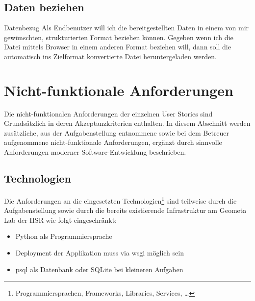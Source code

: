 \subsection{Daten beziehen}

\begin{scrumepic}[label=epic:pd:datenbezug]{Datenbezug}
	Als Endbenutzer will ich die bereitgestellten Daten in einem von mir gewünschten, strukturierten Format beziehen können.
	\storyacceptance	
	Gegeben
	wenn ich die Datei mittels Browser in einem anderen Format beziehen will, dann soll die automatisch ins Zielformat konvertierte Datei heruntergeladen werden.
\end{scrumepic}

\xxx[stories]



\section{Nicht-funktionale Anforderungen}

Die nicht-funktionalen Anforderungen der einzelnen User Stories sind Grundsätzlich in deren Akzeptanzkriterien enthalten.
In diesem Abschnitt werden zusätzliche, aus der Aufgabenstellung entnommene sowie bei dem Betreuer aufgenommene nicht-funktionale Anforderungen, ergänzt durch sinnvolle Anforderungen moderner Software-Entwicklung beschrieben.

\subsection{Technologien}
Die Anforderungen an die eingesetzten Technologien\footnote{Programmiersprachen, Frameworks, Libraries, Services, \dots} sind teilweise durch die Aufgabenstellung sowie durch die bereits existierende Infrastruktur am Geometa Lab der HSR wie folgt eingeschränkt:

\begin{itemize}
	\item Python als Programmiersprache %
	\item Deployment der Applikation muss via \gls{wsgi} möglich sein
	\item \gls{psql} als Datenbank oder SQLite bei kleineren Aufgaben
\end{itemize}


